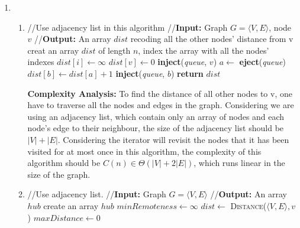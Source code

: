 \documentclass[11pt]{article}
\begin{document}
\begin{enumerate}
\begin{enumerate}
\end{enumerate}
~
\item
\begin{enumerate}
\item
\begin{algorithmic}[1]
	\State //Use adjacency list in this algorithm
	\State //\textbf{Input:} Graph $G = \langle V, E\rangle$, node $v$
	\State //\textbf{Output:} An array $dist$ recoding all the other nodes' distance from v
	\State creat an array $dist$ of length $n$, index the array with all the nodes' indexes
		\State $dist[i]\gets \infty$
		\State $dist[v]\gets 0$
	\EndFor
	\State \textbf{inject}(\textit{queue}, $v$)
		\State $a\gets$ \textbf{eject}(\textit{queue})
				\State $dist[b]\gets dist[a]+1$
				\State \textbf{inject}(\textit{queue}, $b$)
			\EndIf
		\EndFor 
	\EndWhile
	\State \textbf{return} $dist$
\EndFunction
\end{algorithmic}
\textbf{Complexity Analysis:} To find the distance of all other nodes to v, 
one have to traverse all the nodes and edges in the graph. 
Considering we are using an adjacency list, 
which contain only an array of nodes and each node's edge to their neighbour, 
the size of the adjacency list should be $|V| + |E|$. 
Considering the iterator will revisit the nodes that it has 
been visited for at most once in this algorithm, 
the complexity of this algorithm should be $C(n)\in \Theta(|V|+2|E|)$, 
which runs linear in the size of the graph.
\bigskip \\
\item
\begin{algorithmic}[1]
	\State //Use adjacency list.
	\State //\textbf{Input:} Graph $G = \langle V, E\rangle$
	\State //\textbf{Output:} An array $hub$
	\State create an array $hub$
	\State $minRemoteness\gets \infty$
		\State $dist\gets$ \textsc{Distance}($\langle V, E\rangle, v$)
		\State $maxDistance\gets 0$

\end{algorithmic}
\end{enumerate}
\end{enumerate}
\end{document}
